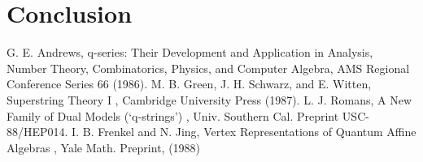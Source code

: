 \documentclass[11pt]{article}
\begin{document}
\section{Conclusion}

G. E. Andrews, q-series: Their Development and Application in Analysis, Number Theory, Combinatorics, Physics, and Computer Algebra, AMS Regional Conference Series 66 (1986). M. B. Green, J. H. Schwarz, and E. Witten, Superstring Theory I , Cambridge University Press (1987). L. J. Romans, A New Family of Dual Models (`q-strings') , Univ. Southern Cal. Preprint USC-88/HEP014. I. B. Frenkel and N. Jing, Vertex Representations of Quantum Affine Algebras , Yale Math. Preprint, (1988)
\end{document}

